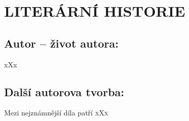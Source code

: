 \documentclass{extarticle} %
\begin{document}
\section*{LITERÁRNÍ HISTORIE}





\subsection*{Autor {\ssmall -- život autora:}}
\noindent 
xXx


\subsection*{Další autorova tvorba:}
\noindent 
Mezi nejznámnější díla patří \textsc{xXx}



\end{document}

